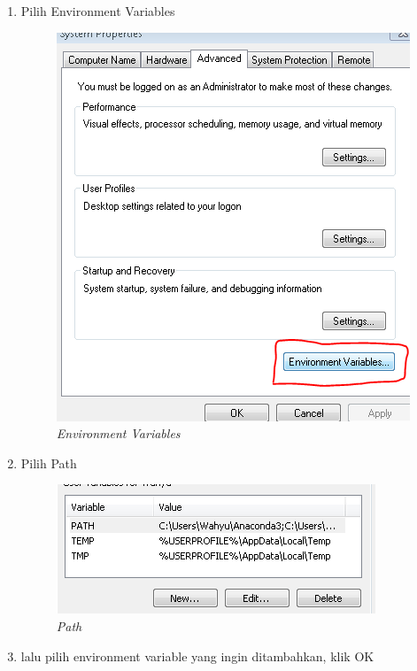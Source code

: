\begin{enumerate}
\item Pilih Environment Variables
\begin{figure}[H]
    \centering
    \includegraphics[scale=0.7]{figures/a3}
    \caption{\textit{Environment Variables}}
    \label{Environment3}
\end{figure}

\item Pilih Path
\begin{figure}[H]
    \centering
    \includegraphics[scale=0.7]{figures/a4}
    \caption{\textit{Path}}
    \label{Environment4}
\end{figure}
\item lalu pilih environment variable yang ingin ditambahkan, klik OK

\end{enumerate}

